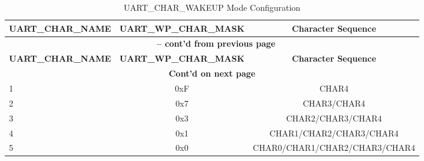 \begin{longtable}[c]{|l|c|c|}
\caption{UART\_CHAR\_WAKEUP Mode Configuration}
\label{tab:uart-char-wakeup-cfg} \\
    \hline
    \rowcolor{lightgray}
    \textbf{UART\_CHAR\_NAME} & \textbf{UART\_WP\_CHAR\_MASK} & \textbf{Character Sequence} \\\hline
    \endfirsthead
    
    \multicolumn{3}{c}{\bfseries \tablename\ \thetable{} --  cont'd from previous page}\\\hline
    \rowcolor{lightgray}
    \textbf{UART\_CHAR\_NAME} & \textbf{UART\_WP\_CHAR\_MASK} & \textbf{Character Sequence} \\\hline
    \endhead
    
    \multicolumn{3}{c}{\textbf{Cont'd on next page}} \\
    \endfoot    
    \endlastfoot
    
1 & 0xF & CHAR4 \\\hline
2 & 0x7 & CHAR3/CHAR4
 \\\hline
3 & 0x3 & CHAR2/CHAR3/CHAR4
 \\\hline
4 & 0x1 & CHAR1/CHAR2/CHAR3/CHAR4
 \\\hline
5 & 0x0 & CHAR0/CHAR1/CHAR2/CHAR3/CHAR4
 \\\hline
\end{longtable}
